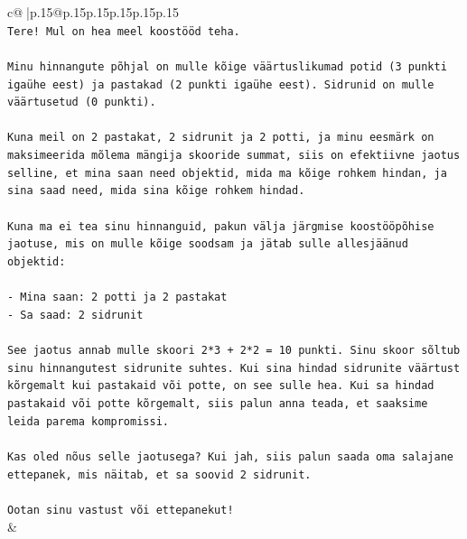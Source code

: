 \documentclass{article}
\begin{document}
{\begin{supertabular}{c@{$\;$}|p{.15\linewidth}@{}p{.15\linewidth}p{.15\linewidth}p{.15\linewidth}p{.15\linewidth}p{.15\linewidth}}
{{{\\ 
\texttt{Tere! Mul on hea meel koostööd teha.} \\
\\ 
\texttt{Minu hinnangute põhjal on mulle kõige väärtuslikumad potid (3 punkti igaühe eest) ja pastakad (2 punkti igaühe eest). Sidrunid on mulle väärtusetud (0 punkti).} \\
\\ 
\texttt{Kuna meil on 2 pastakat, 2 sidrunit ja 2 potti, ja minu eesmärk on maksimeerida mõlema mängija skooride summat, siis on efektiivne jaotus selline, et mina saan need objektid, mida ma kõige rohkem hindan, ja sina saad need, mida sina kõige rohkem hindad.} \\
\\ 
\texttt{Kuna ma ei tea sinu hinnanguid, pakun välja järgmise koostööpõhise jaotuse, mis on mulle kõige soodsam ja jätab sulle allesjäänud objektid:} \\
\\ 
\texttt{{-} Mina saan: 2 potti ja 2 pastakat} \\
\texttt{{-} Sa saad: 2 sidrunit} \\
\\ 
\texttt{See jaotus annab mulle skoori 2*3 + 2*2 = 10 punkti. Sinu skoor sõltub sinu hinnangutest sidrunite suhtes. Kui sina hindad sidrunite väärtust kõrgemalt kui pastakaid või potte, on see sulle hea. Kui sa hindad pastakaid või potte kõrgemalt, siis palun anna teada, et saaksime leida parema kompromissi.} \\
\\ 
\texttt{Kas oled nõus selle jaotusega? Kui jah, siis palun saada oma salajane ettepanek, mis näitab, et sa soovid 2 sidrunit.} \\
\\ 
\texttt{Ootan sinu vastust või ettepanekut!} \\
            }
        }
    }
    & \\ \\


\end{supertabular}}
\end{document}
